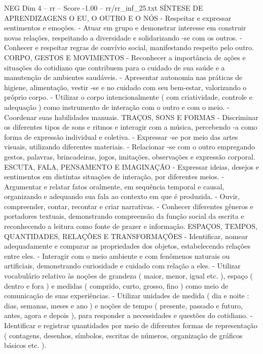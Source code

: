 \begin{textsample}{NEG Dim 4 – rr – Score -1.00 – rr/rr\_inf\_25.txt}
SÍNTESE DE APRENDIZAGENS O EU, O OUTRO E O NÓS - Respeitar e expressar sentimentos e emoções. - Atuar em grupo e demonstrar interesse em construir novas relações, respeitando a diversidade e solidarizando -se com os outros. - Conhecer e respeitar regras de convívio social, manifestando respeito pelo outro.
CORPO, GESTOS E MOVIMENTOS - Reconhecer a importância de ações e situações do cotidiano que contribuem para o cuidado de sua saúde e a manutenção de ambientes saudáveis. - Apresentar autonomia nas práticas de higiene, alimentação, vestir -se e no cuidado com seu bem-estar, valorizando o próprio corpo. - Utilizar o corpo intencionalmente ( com criatividade, controle e adequação ) como instrumento de interação com o outro e com o meio. - Coordenar suas habilidades manuais.
TRAÇOS, SONS E FORMAS - Discriminar os diferentes tipos de sons e ritmos e interagir com a música, percebendo -a como forma de expressão individual e coletiva. - Expressar -se por meio das artes visuais, utilizando diferentes materiais. - Relacionar -se com o outro empregando gestos, palavras, brincadeiras, jogos, imitações, observações e expressão corporal.
ESCUTA, FALA, PENSAMENTO E IMAGINAÇÃO - Expressar ideias, desejos e sentimentos em distintas situações de interação, por diferentes meios. - Argumentar e relatar fatos oralmente, em sequência temporal e causal, organizando e adequando sua fala ao contexto em que é produzida. - Ouvir, compreender, contar, recontar e criar narrativas. - Conhecer diferentes gêneros e portadores textuais, demonstrando compreensão da função social da escrita e reconhecendo a leitura como fonte de prazer e informação.
ESPAÇOS, TEMPOS, QUANTIDADES, RELAÇÕES E TRANSFORMAÇÕES - Identificar, nomear adequadamente e comparar as propriedades dos objetos, estabelecendo relações entre eles. - Interagir com o meio ambiente e com fenômenos naturais ou artificiais, demonstrando curiosidade e cuidado com relação a eles. - Utilizar vocabulário relativo às noções de grandeza ( maior, menor, igual etc. ), espaço ( dentro e fora ) e medidas ( comprido, curto, grosso, fino ) como meio de comunicação de suas experiências. - Utilizar unidades de medida ( dia e noite : dias, semanas, meses e ano ) e noções de tempo ( presente, passado e futuro, antes, agora e depois ), para responder a necessidades e questões do cotidiano. - Identificar e registrar quantidades por meio de diferentes formas de representação ( contagens, desenhos, símbolos, escritas de números, organização de gráficos básicos etc. ).

\end{textsample}
